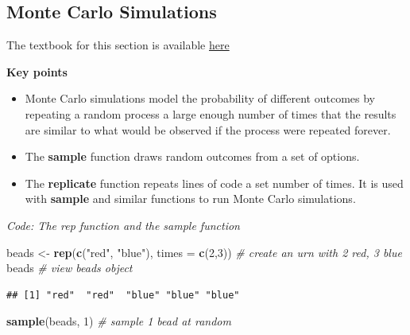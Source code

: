 \documentclass[
]{article}
\newenvironment{Shaded}{\begin{snugshade}}{\end{snugshade}}
\newcommand{\CommentTok}[1]{\textcolor[rgb]{0.56,0.35,0.01}{\textit{#1}}}
\newcommand{\DataTypeTok}[1]{\textcolor[rgb]{0.13,0.29,0.53}{#1}}
\newcommand{\DecValTok}[1]{\textcolor[rgb]{0.00,0.00,0.81}{#1}}
\newcommand{\KeywordTok}[1]{\textcolor[rgb]{0.13,0.29,0.53}{\textbf{#1}}}
\newcommand{\NormalTok}[1]{#1}
\newcommand{\StringTok}[1]{\textcolor[rgb]{0.31,0.60,0.02}{#1}}
\providecommand{\tightlist}{%
  \setlength{\itemsep}{0pt}\setlength{\parskip}{0pt}}
\begin{document}
\hypertarget{monte-carlo-simulations}{%
\subsection{Monte Carlo Simulations}\label{monte-carlo-simulations}}

The textbook for this section is available
\href{https://rafalab.github.io/dsbook/probability.html\#monte-carlo-simulations}{here}

\textbf{Key points}

\begin{itemize}
\tightlist
\item
  Monte Carlo simulations model the probability of different outcomes by
  repeating a random process a large enough number of times that the
  results are similar to what would be observed if the process were
  repeated forever.
\item
  The \textbf{sample} function draws random outcomes from a set of
  options.
\item
  The \textbf{replicate} function repeats lines of code a set number of
  times. It is used with \textbf{sample} and similar functions to run
  Monte Carlo simulations.
\end{itemize}

\emph{Code: The rep function and the sample function}

\begin{Shaded}
\begin{Highlighting}[]
\NormalTok{beads \textless{}{-}}\StringTok{ }\KeywordTok{rep}\NormalTok{(}\KeywordTok{c}\NormalTok{(}\StringTok{"red"}\NormalTok{, }\StringTok{"blue"}\NormalTok{), }\DataTypeTok{times =} \KeywordTok{c}\NormalTok{(}\DecValTok{2}\NormalTok{,}\DecValTok{3}\NormalTok{))    }\CommentTok{\# create an urn with 2 red, 3 blue}
\NormalTok{beads    }\CommentTok{\# view beads object}
\end{Highlighting}
\end{Shaded}

\begin{verbatim}
## [1] "red"  "red"  "blue" "blue" "blue"
\end{verbatim}

\begin{Shaded}
\begin{Highlighting}[]
\KeywordTok{sample}\NormalTok{(beads, }\DecValTok{1}\NormalTok{)    }\CommentTok{\# sample 1 bead at random}
\end{Highlighting}
\end{Shaded}
\end{document}
